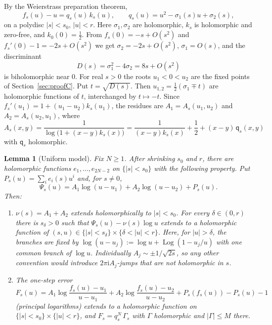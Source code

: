 \documentclass[11pt]{amsart}
\newtheorem{lemma}[theorem]{Lemma}
\theoremstyle{definition}
\newcommand{\ii}{\mathrm{i}}
\begin{document}
By the Weierstrass preparation theorem,
\begin{equation}\label{eq:weier}
 f_s(u)-u=q_s(u)\,k_s(u),\qquad q_s(u)=u^2-\sigma_1(s)u+\sigma_2(s),
\end{equation}
on a polydisc $|s|<s_0$, $|u|<r$.  Here $\sigma_1,\sigma_2$ are holomorphic,
$k_s$ is holomorphic and zero-free, and $k_0(0)=\tfrac12$.  From
$f_s(0)=-s+O(s^2)$ and $f_s'(0)-1=-2s+O(s^2)$ we get $\sigma_2=-2s+O(s^2)$,
$\sigma_1=O(s)$, and the discriminant
\[
 D(s)=\sigma_1^2-4\sigma_2=8s+O(s^2)
\]
is biholomorphic near $0$.  For real $s>0$ the roots $u_1<0<u_2$ are the fixed
points of Section~\ref{sec:proofC}.  Put $t=\sqrt{D(s)}$.  Then
$u_{1,2}=\tfrac12(\sigma_1\mp t)$ are holomorphic functions of $t$, interchanged by
$t\mapsto-t$.  Since $f_s'(u_1)=1+(u_1-u_2)k_s(u_1)$, the residues are
$A_1=A_s(u_1,u_2)$ and $A_2=A_s(u_2,u_1)$, where
\[
 A_s(x,y)=\frac1{\log\bigl(1+(x-y)k_s(x)\bigr)}
 =\frac1{(x-y)k_s(x)}+\frac12+(x-y)\,\mathsf q_s(x,y)
\]
with $\mathsf q_s$ holomorphic.

\begin{lemma}[Uniform model]\label{lem:model}
Fix $N\ge1$.  After shrinking $s_0$ and $r$, there are holomorphic functions
$e_1,\dots,e_{2N-2}$ on $\{|s|<s_0\}$ with the following property.  Put
$P_s(u)=\sum_ie_i(s)u^i$ and, for $s\ne0$,
\[
 \Psi_s(u)=A_1\log(u-u_1)+A_2\log(u-u_2)+P_s(u).
\]
Then:
\begin{enumerate}
\item $\nu(s)=A_1+A_2$ extends holomorphically to $|s|<s_0$.  For every
  $\delta\in(0,r)$ there is $s_\delta>0$ such that
  $\Psi_s(u)-\nu(s)\log u$ extends to a holomorphic function of
  $(s,u)\in\{|s|<s_\delta\}\times\{\delta<|u|<r\}$.  Here, for $|u|>\delta$,
  the branches are fixed by $\log(u-u_j):=\log u+\operatorname{Log}(1-u_j/u)$
  with one common branch of $\log u$.  Individually $A_j\sim\pm1/\sqrt{2s}$, so
  any other convention would introduce $2\pi\ii A_j$-jumps that are not
  holomorphic in $s$.
\item The one-step error
  \[
   F_s(u)=A_1\log\frac{f_s(u)-u_1}{u-u_1}+A_2\log\frac{f_s(u)-u_2}{u-u_2}
   +P_s(f_s(u))-P_s(u)-1
  \]
  (principal logarithms) extends to a holomorphic function on
  $\{|s|<s_0\}\times\{|u|<r\}$, and $F_s=q_s^N\,\Gamma_s$ with $\Gamma$
  holomorphic and $|\Gamma|\le M$ there.
\end{enumerate}
\end{lemma}
\end{document}
